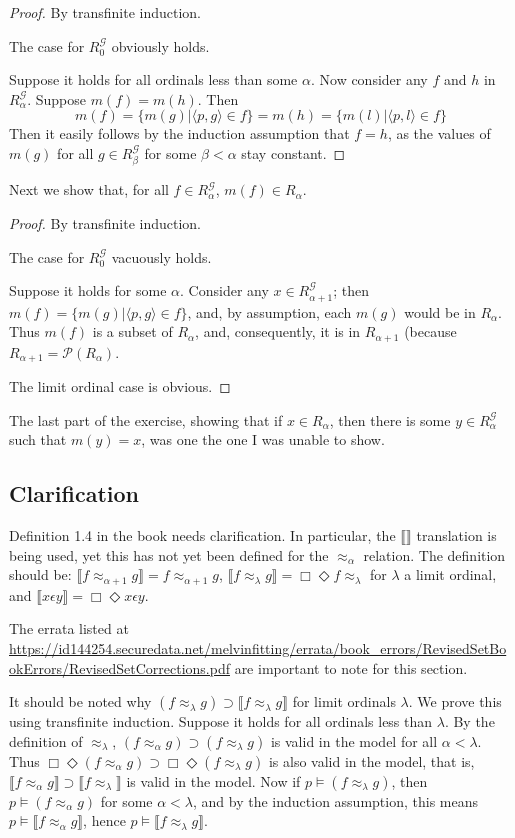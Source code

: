 \documentclass{article}
\newcommand{\lbc}{\llbracket}
\newcommand{\rbc}{\rrbracket}
\theoremstyle{definition}
\begin{document}
\begin{proof}
By transfinite induction.

The case for $R^\mathcal{G}_0$ obviously holds.

Suppose it holds for all ordinals less than some $\alpha$. Now consider any 
$f$ and $h$ in $R^\mathcal{G}_\alpha$. Suppose $m(f)=m(h)$. Then 
\[ m(f)=\{m(g)|\langle p,g\rangle\in f\}=m(h)=\{m(l)|\langle p,l\rangle\in f\} \]
Then it easily follows by the induction assumption that $f=h$, as the values of $m(g)$ for all 
$g\in R^\mathcal{G}_\beta$ for some $\beta<\alpha$ stay constant. 
\end{proof}

Next we show that, for all $f\in R^\mathcal{G}_\alpha$, $m(f)\in R_\alpha$.

\begin{proof}
By transfinite induction.

The case for $R^\mathcal{G}_0$ vacuously holds.

Suppose it holds for some $\alpha$. Consider any $x\in R^\mathcal{G}_{\alpha+1}$; then
$m(f)=\{m(g)|\langle p,g\rangle\in f\}$, and, by assumption, each 
$m(g)$ would be in $R_\alpha$. Thus $m(f)$ is a subset of $R_\alpha$, and, consequently, 
it is in $R_{\alpha+1}$ (because $R_{\alpha+1}=\mathcal{P}(R_\alpha)$.

The limit ordinal case is obvious.
\end{proof}

The last part of the exercise, showing that if $x\in R_\alpha$, then there is some $y\in R^\mathcal{G}_\alpha$ such 
that $m(y)=x$, was one the one I was unable to show.

\subsection*{Clarification}
Definition 1.4 in the book needs clarification. In particular, the $\lbc\rbc$ translation is being used, 
yet this has not yet been defined for the $\approx_\alpha$ relation. The definition should be:
$\lbc f\approx_{\alpha+1} g\rbc=f\approx_{\alpha+1} g$, 
$\lbc f\approx_\lambda g\rbc=\Box\Diamond f\approx_\lambda$ for $\lambda$ a limit ordinal, and
$\lbc x\epsilon y\rbc=\Box\Diamond x\epsilon y$. 

The errata listed at \url{https://id144254.securedata.net/melvinfitting/errata/book_errors/RevisedSetBookErrors/RevisedSetCorrections.pdf}
are important to note for this section.

It should be noted why $(f\approx_\lambda g)\supset\lbc f\approx_\lambda g\rbc$ for limit ordinals $\lambda$. We prove this using 
transfinite induction. Suppose it holds for all ordinals less than $\lambda$. By the definition of 
$\approx_\lambda$, $(f\approx_\alpha g)\supset (f\approx_\lambda g)$ is valid in the model for 
all $\alpha<\lambda$. Thus $\Box\Diamond(f\approx_\alpha g)\supset\Box\Diamond (f\approx_\lambda g)$ is also 
valid in the model, that is, $\lbc f\approx_\alpha g\rbc\supset \lbc f\approx_\lambda\rbc$ is valid in the model.
Now if $p\vDash (f\approx_\lambda g)$, then $p\vDash (f\approx_\alpha g)$ for some $\alpha<\lambda$, and by the induction assumption, 
this means $p\vDash \lbc f\approx_\alpha g\rbc$, hence $p\vDash\lbc f\approx_\lambda g\rbc$.
\end{document}
